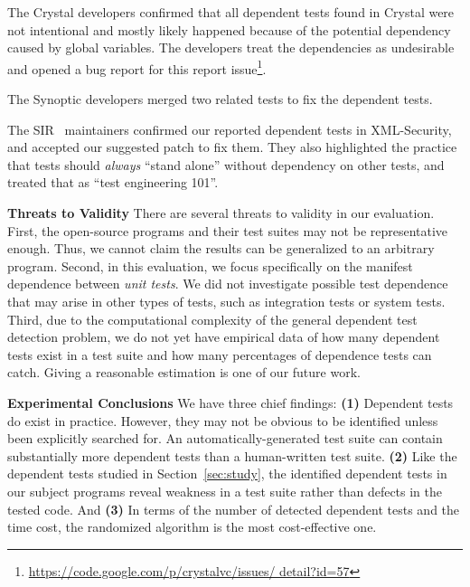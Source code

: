 The Crystal developers confirmed that all dependent tests
found in Crystal were not intentional and mostly likely
happened because of the potential dependency
caused by global variables. The developers treat the
dependencies as undesirable and opened a bug report for
this report issue\footnote{\url{https://code.google.com/p/crystalvc/issues/ detail?id=57}}.

The Synoptic developers merged two related tests to fix
the dependent tests.

The SIR~\cite{sir} maintainers confirmed our reported dependent
tests in XML-Security, and accepted our
suggested patch to fix them. They also highlighted the practice
that tests should \textit{always} ``stand alone''
without dependency on other tests, and treated that as
``test engineering 101''. 

\vspace{1mm}
\noindent \textbf{Threats to Validity}
There are several threats to validity in our evaluation.
First, the \subjnum open-source
programs and their test suites may not be
representative enough. Thus, we cannot claim the results
can be generalized to an arbitrary program.
Second, in this evaluation, we focus specifically on
the {manifest dependence} between \textit{unit tests}.
We did not investigate possible test dependence that may arise
in other types of tests, such as integration tests
or system tests.
Third, due to the computational complexity of the general dependent test
detection problem, we do not yet have
empirical data of how many dependent
tests exist in a test suite and how many percentages of dependence tests
\ourtool can catch.  Giving a reasonable estimation is one of our future work.


\vspace{1mm}

\noindent \textbf{Experimental Conclusions}
We have three chief findings: \textbf{(1)}
Dependent tests do exist in practice. However,
they may not be obvious to be identified
unless been explicitly searched for.
An automatically-generated test suite can contain
substantially more dependent tests than a human-written
test suite.
\textbf{(2)} Like the dependent tests
studied in Section~\ref{sec:study}, the identified
dependent tests in our subject programs reveal weakness
in a test suite rather than defects in the tested code.
And \textbf{(3)} In terms
of the number of detected dependent tests
and the time cost, the randomized algorithm is the
most cost-effective one.

